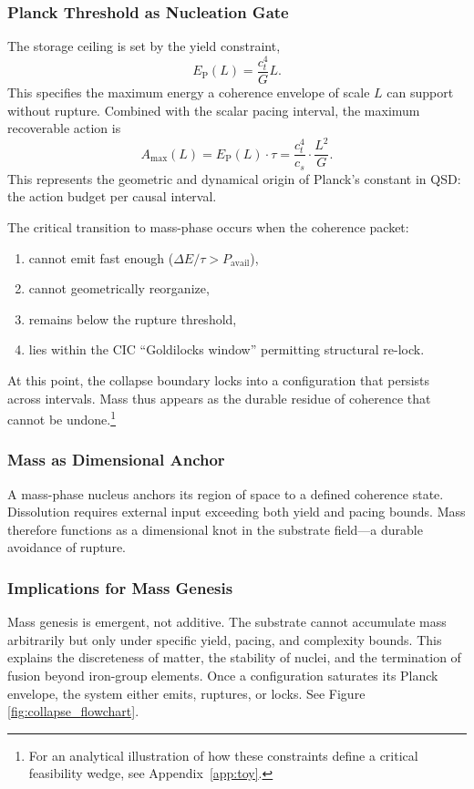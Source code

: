 \documentclass[preprints,article,submit,pdftex,moreauthors]{Definitions/mdpi}
\begin{document}
\subsubsection*{Planck Threshold as Nucleation Gate}

The storage ceiling is set by the yield constraint,
\[
E_{\mathrm{P}}(L) = \frac{c_t^4}{G}L.
\]
This specifies the maximum energy a coherence envelope of scale \( L \) can support without rupture. Combined with the scalar pacing interval, the maximum recoverable action is
\[
A_{\max}(L) = E_{\mathrm{P}}(L)\cdot\tau = \frac{c_t^4}{c_s}\cdot\frac{L^2}{G}.
\]
This represents the geometric and dynamical origin of Planck’s constant in QSD: the action budget per causal interval.

The critical transition to mass-phase occurs when the coherence packet:
\begin{enumerate}
\item cannot emit fast enough (\( \Delta E/\tau > P_{\mathrm{avail}} \)),
\item cannot geometrically reorganize,
\item remains below the rupture threshold,
\item lies within the CIC “Goldilocks window” permitting structural re-lock.
\end{enumerate}

At this point, the collapse boundary locks into a configuration that persists across intervals. Mass thus appears as the durable residue of coherence that cannot be undone.\footnote{For an analytical illustration of how these constraints define a critical feasibility wedge, see Appendix~\ref{app:toy}.}

\subsubsection*{Mass as Dimensional Anchor}

A mass-phase nucleus anchors its region of space to a defined coherence state. Dissolution requires external input exceeding both yield and pacing bounds. Mass therefore functions as a dimensional knot in the substrate field—a durable avoidance of rupture.

\subsubsection*{Implications for Mass Genesis}

Mass genesis is emergent, not additive. The substrate cannot accumulate mass arbitrarily but only under specific yield, pacing, and complexity bounds. This explains the discreteness of matter, the stability of nuclei, and the termination of fusion beyond iron-group elements. Once a configuration saturates its Planck envelope, the system either emits, ruptures, or locks. See Figure \ref{fig:collapse_flowchart}.
\end{document}
